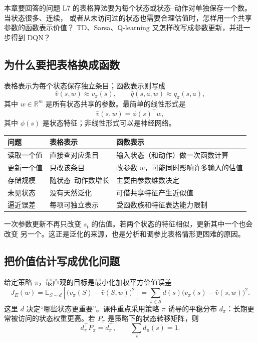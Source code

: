 \documentclass[11pt,a4paper,fontset=fandol]{ctexart}
\newcommand{\Sset}{\mathcal{S}}
\newcommand{\E}{\mathbb{E}}
\begin{document}
\begin{goalbox}{本章要回答的问题}
L7 的表格算法要为每个状态或状态--动作对单独保存一个数。当状态很多、连续，
或者从未访问过的状态也需要合理估值时，怎样用一个共享参数的函数表示价值？
TD、Sarsa、Q-learning 又怎样改写成参数更新，并进一步得到 DQN？
\end{goalbox}

\subsection{为什么要把表格换成函数}

表格表示为每个状态保存独立条目；函数表示则写成
\[
\hat v(s,w)\approx v_\pi(s),
\qquad
\hat q(s,a,w)\approx q_\pi(s,a),
\]
其中 \(w\in\mathbb{R}^m\) 是所有状态共享的参数。最简单的线性形式是
\[
\boxed{\hat v(s,w)=\phi(s)^\top w},
\]
其中 \(\phi(s)\) 是状态特征；非线性形式可以是神经网络。

\begin{center}
\begin{tabularx}{\textwidth}{
  >{\raggedright\arraybackslash}p{}
  >{\raggedright\arraybackslash}p{}
  X}
\toprule
问题 & 表格表示 & 函数表示\\
\midrule
读取一个值 & 直接查对应条目 & 输入状态（和动作）做一次函数计算\\
更新一个值 & 只改该条目 & 改参数 \(w\)，可能同时影响许多输入的估值\\
存储规模 & 随状态--动作数增长 & 主要由参数维数决定\\
未见状态 & 没有天然泛化 & 可借共享特征产生近似值\\
逼近误差 & 每项可独立表示 & 受函数族和特征表达能力限制\\
\bottomrule
\end{tabularx}
\end{center}

\begin{warningbox}
一次参数更新不再只改变 \(s_t\) 的估值。若两个状态的特征相似，更新其中一个也会改变
另一个。这正是泛化的来源，也是分析和调参比表格情形更困难的原因。
\end{warningbox}

\subsection{把价值估计写成优化问题}

给定策略 \(\pi\)，最直观的目标是最小化加权平方价值误差
\[
J_E(w)
=\E_{S\sim d}\!\left[
  \bigl(v_\pi(S)-\hat v(S,w)\bigr)^2
\right]
=\sum_{s\in\Sset}d(s)
  \bigl(v_\pi(s)-\hat v(s,w)\bigr)^2.
\]
这里 \(d\) 决定“哪些状态更重要”。课件重点采用策略 \(\pi\) 诱导的平稳分布
\(d_\pi\)：长期更常被访问的状态权重更高。若
\(P_\pi\) 是策略下的状态转移矩阵，则
\[
d_\pi^\top P_\pi=d_\pi^\top,
\qquad
\sum_s d_\pi(s)=1.
\]
\end{document}
